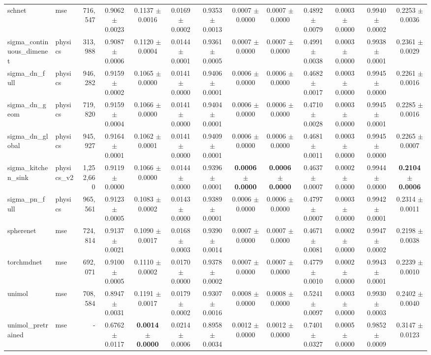 \begin{tabular}{llrcccccccccc}
schnet & mse & 716,547 & 0.9062 $\pm$ 0.0023 & 0.1137 $\pm$ 0.0016 & 0.0169 $\pm$ 0.0002 & 0.9353 $\pm$ 0.0013 & 0.0007 $\pm$ 0.0000 & 0.0007 $\pm$ 0.0000 & 0.4892 $\pm$ 0.0079 & 0.0003 $\pm$ 0.0000 & 0.9940 $\pm$ 0.0002 & 0.2253 $\pm$ 0.0036 \\
sigma\_continuous\_dimenet & physics & 313,988 & 0.9087 $\pm$ 0.0006 & 0.1120 $\pm$ 0.0004 & 0.0144 $\pm$ 0.0001 & 0.9361 $\pm$ 0.0005 & 0.0007 $\pm$ 0.0000 & 0.0007 $\pm$ 0.0000 & 0.4991 $\pm$ 0.0038 & 0.0003 $\pm$ 0.0000 & 0.9938 $\pm$ 0.0001 & 0.2361 $\pm$ 0.0029 \\
sigma\_dn\_full & physics & 946,282 & 0.9159 $\pm$ 0.0002 & 0.1065 $\pm$ 0.0000 & 0.0141 $\pm$ 0.0000 & 0.9406 $\pm$ 0.0001 & 0.0006 $\pm$ 0.0000 & 0.0006 $\pm$ 0.0000 & 0.4682 $\pm$ 0.0017 & 0.0003 $\pm$ 0.0000 & 0.9945 $\pm$ 0.0000 & 0.2261 $\pm$ 0.0016 \\
sigma\_dn\_geom & physics & 719,820 & 0.9159 $\pm$ 0.0004 & 0.1066 $\pm$ 0.0000 & 0.0141 $\pm$ 0.0000 & 0.9404 $\pm$ 0.0001 & 0.0006 $\pm$ 0.0000 & 0.0006 $\pm$ 0.0000 & 0.4710 $\pm$ 0.0028 & 0.0003 $\pm$ 0.0000 & 0.9945 $\pm$ 0.0001 & 0.2285 $\pm$ 0.0016 \\
sigma\_dn\_global & physics & 945,927 & 0.9164 $\pm$ 0.0001 & 0.1062 $\pm$ 0.0001 & 0.0141 $\pm$ 0.0000 & 0.9409 $\pm$ 0.0001 & 0.0006 $\pm$ 0.0000 & 0.0006 $\pm$ 0.0000 & 0.4681 $\pm$ 0.0011 & 0.0003 $\pm$ 0.0000 & 0.9945 $\pm$ 0.0000 & 0.2265 $\pm$ 0.0007 \\
sigma\_kitchen\_sink & physics_v2 & 1,252,660 & 0.9119 $\pm$ 0.0000 & 0.1066 $\pm$ 0.0000 & 0.0144 $\pm$ 0.0000 & 0.9396 $\pm$ 0.0001 & \textbf{0.0006 $\pm$ 0.0000} & \textbf{0.0006 $\pm$ 0.0000} & 0.4637 $\pm$ 0.0007 & 0.0002 $\pm$ 0.0000 & 0.9944 $\pm$ 0.0000 & \textbf{0.2104 $\pm$ 0.0006} \\
sigma\_pn\_full & physics & 965,561 & 0.9123 $\pm$ 0.0005 & 0.1083 $\pm$ 0.0002 & 0.0143 $\pm$ 0.0000 & 0.9389 $\pm$ 0.0001 & 0.0006 $\pm$ 0.0000 & 0.0006 $\pm$ 0.0000 & 0.4797 $\pm$ 0.0007 & 0.0003 $\pm$ 0.0000 & 0.9942 $\pm$ 0.0001 & 0.2314 $\pm$ 0.0011 \\
spherenet & mse & 724,814 & 0.9137 $\pm$ 0.0021 & 0.1090 $\pm$ 0.0017 & 0.0168 $\pm$ 0.0003 & 0.9390 $\pm$ 0.0014 & 0.0007 $\pm$ 0.0000 & 0.0007 $\pm$ 0.0000 & 0.4671 $\pm$ 0.0081 & 0.0002 $\pm$ 0.0000 & 0.9947 $\pm$ 0.0002 & 0.2198 $\pm$ 0.0038 \\
torchmdnet & mse & 692,071 & 0.9100 $\pm$ 0.0005 & 0.1110 $\pm$ 0.0002 & 0.0170 $\pm$ 0.0000 & 0.9378 $\pm$ 0.0002 & 0.0007 $\pm$ 0.0000 & 0.0007 $\pm$ 0.0000 & 0.4779 $\pm$ 0.0010 & 0.0002 $\pm$ 0.0000 & 0.9943 $\pm$ 0.0001 & 0.2239 $\pm$ 0.0010 \\
unimol & mse & 708,584 & 0.8947 $\pm$ 0.0031 & 0.1191 $\pm$ 0.0017 & 0.0179 $\pm$ 0.0002 & 0.9307 $\pm$ 0.0016 & 0.0008 $\pm$ 0.0000 & 0.0008 $\pm$ 0.0000 & 0.5241 $\pm$ 0.0097 & 0.0003 $\pm$ 0.0000 & 0.9930 $\pm$ 0.0003 & 0.2402 $\pm$ 0.0040 \\
unimol\_pretrained & mse & - & 0.6762 $\pm$ 0.0117 & \textbf{0.0014 $\pm$ 0.0000} & 0.0214 $\pm$ 0.0006 & 0.8958 $\pm$ 0.0034 & 0.0012 $\pm$ 0.0000 & 0.0012 $\pm$ 0.0000 & 0.7401 $\pm$ 0.0327 & 0.0005 $\pm$ 0.0000 & 0.9852 $\pm$ 0.0009 & 0.3147 $\pm$ 0.0123 \\
\bottomrule
\end{tabular}
